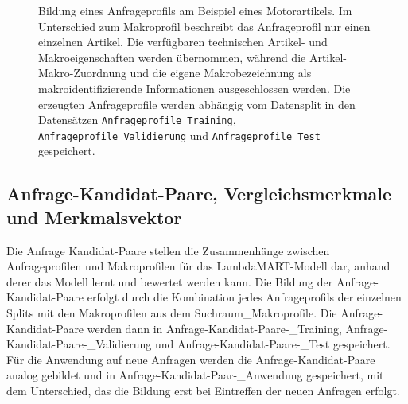 \begin{figure}[H]
        \caption{ Bildung eines Anfrageprofils am Beispiel eines Motorartikels. Im Unterschied zum Makroprofil beschreibt das Anfrageprofil nur einen einzelnen Artikel. Die verfügbaren technischen Artikel- und Makroeigenschaften werden übernommen, während die Artikel-Makro-Zuordnung und die eigene Makrobezeichnung als makroidentifizierende Informationen ausgeschlossen werden. 
        Die erzeugten Anfrageprofile werden abhängig vom Datensplit in den Datensätzen \texttt{Anfrageprofile\_Training}, \texttt{Anfrageprofile\_Validierung} und \texttt{Anfrageprofile\_Test} gespeichert. } 
        \label{fig:anfrageprofil_motor} 
    \end{figure}

\subsection{Anfrage-Kandidat-Paare, Vergleichsmerkmale und Merkmalsvektor} 
\label{sec:anfrage_kandidat_paar_vergleichsmerkmale_und_merkmalsvektor} 

Die Anfrage Kandidat-Paare stellen die Zusammenhänge zwischen Anfrageprofilen und Makroprofilen für das LambdaMART-Modell dar, anhand derer das Modell lernt und bewertet werden kann.
Die Bildung der Anfrage-Kandidat-Paare erfolgt durch die Kombination jedes Anfrageprofils der einzelnen Splits mit den Makroprofilen aus dem Suchraum\_Makroprofile. 
Die Anfrage-Kandidat-Paare werden dann in Anfrage-Kandidat-Paare-\_Training, Anfrage-Kandidat-Paare-\_Validierung und Anfrage-Kandidat-Paare-\_Test gespeichert.
Für die Anwendung auf neue Anfragen werden die Anfrage-Kandidat-Paare analog gebildet und in Anfrage-Kandidat-Paar-\_Anwendung gespeichert, mit dem Unterschied, das die Bildung erst bei Eintreffen der neuen Anfragen erfolgt.

